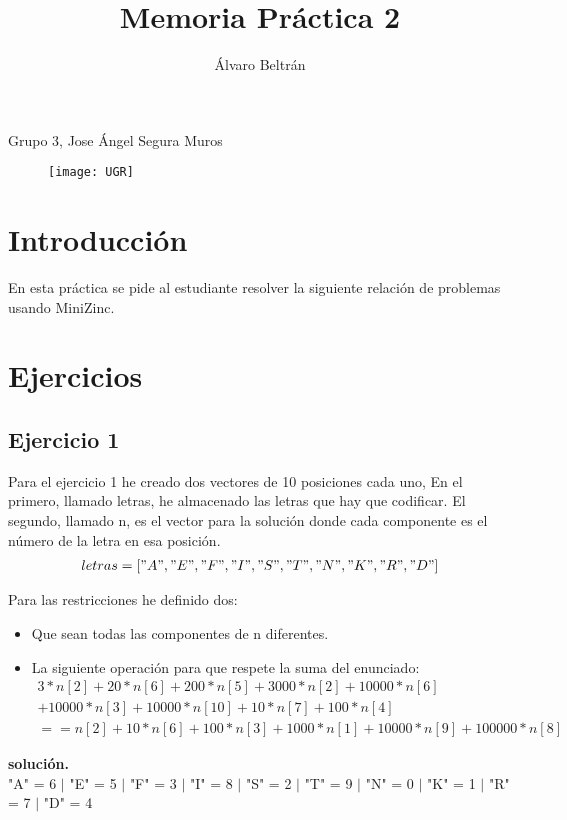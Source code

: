 \documentclass[a4paper,11pt]{article}
\title{Memoria Práctica 2}
\author{Álvaro Beltrán}
\begin{document}
\maketitle
\begin{center}
Grupo 3, Jose Ángel Segura Muros
\end{center}

\begin{figure}[h]
\texttt{[image: UGR]}
\centering
\end{figure}

\newpage

\section{Introducción}
En esta práctica se pide al estudiante resolver la siguiente relación de problemas usando MiniZinc.

\section{Ejercicios}

\subsection{Ejercicio 1}

Para el ejercicio 1 he creado dos vectores de 10 posiciones cada uno, En el primero, llamado letras, he almacenado las letras que hay que codificar. El segundo, llamado n, es el vector para la solución donde cada componente es el número de la letra en esa posición.
\begin{align*}
letras=["A","E","F","I","S","T","N","K","R","D"]
\end{align*}

Para las restricciones he definido dos: 
\begin{itemize}
\item Que sean todas las componentes de n diferentes.
\item La siguiente operación para que respete la suma del enunciado:
\begin{align*}
3*n[2]+20*n[6]+200*n[5]+3000*n[2]+10000*n[6]\\+10000*n[3]+10000*n[10]+10*n[7]+100*n[4]\\
==n[2]+10*n[6]+100*n[3]+1000*n[1]+10000*n[9]+100000*n[8]
\end{align*}

\end{itemize}
\textbf{solución.}\\
"A" = 6 $|$
"E" = 5 $|$
"F" = 3 $|$
"I" = 8 $|$
"S" = 2 $|$
"T" = 9 $|$
"N" = 0 $|$
"K" = 1 $|$
"R" = 7 $|$
"D" = 4
\end{document}
